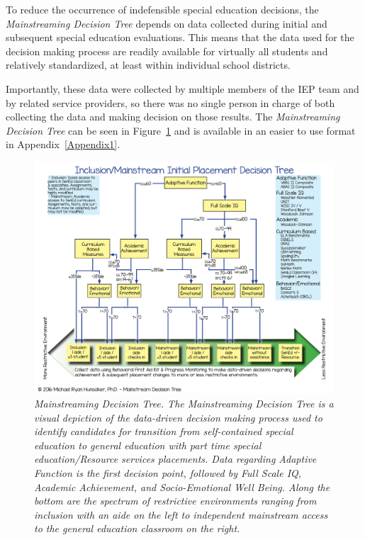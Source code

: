 \documentclass[twoside]{article}
\begin{document}
To reduce the occurrence of indefensible special education decisions, the \textit{Mainstreaming Decision Tree} depends on data collected during initial and subsequent special education evaluations. This means that the data used for the decision making process are readily available for virtually all students and relatively standardized, at least within individual school districts. 

Importantly, these data were collected by multiple members of the IEP team and by related service providers, so there was no single person in charge of both collecting the data and making decision on those results. The \textit{Mainstreaming Decision Tree} can be seen in Figure~\ref{fig1} and is available in an easier to use format in Appendix~\ref{Appendix1}.
%
%
%
%
\begin{figure}[htp!]
\centering
\includegraphics[width=\textwidth]{Figure1.pdf}
\caption[Mainstreaming Decision Tree]{\textit{Mainstreaming Decision Tree. The Mainstreaming Decision Tree is a visual depiction of the data-driven decision making process used to identify candidates for transition from self-contained special education to general education with part time special education/Resource services placements. Data regarding Adaptive Function is the first decision point, followed by Full Scale IQ, Academic Achievement, and Socio-Emotional Well Being. Along the bottom are the spectrum of restrictive environments ranging from inclusion with an aide on the left to independent mainstream access to the general education classroom on the right.}}
\label{fig1}
\end{figure}
%
%
%
%
%
%
%
\end{document}
